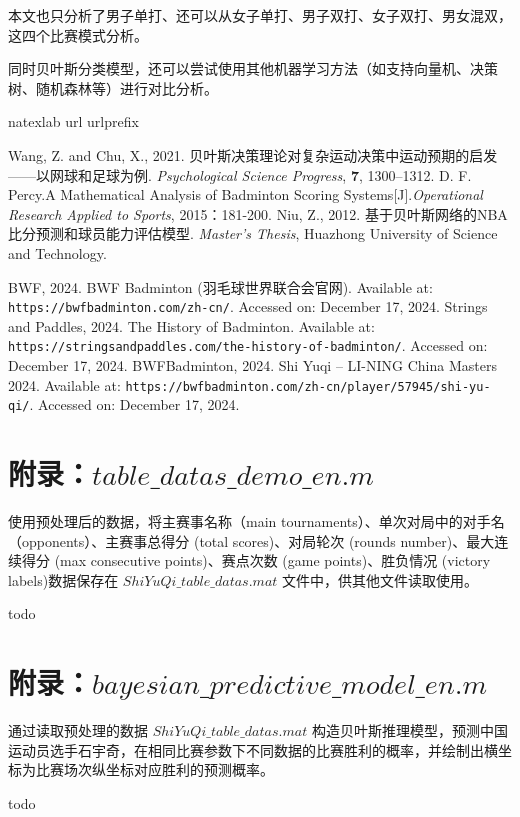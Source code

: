 \documentclass[12pt]{article}
\begin{document}
本文也只分析了男子单打、还可以从女子单打、男子双打、女子双打、男女混双，这四个比赛模式分析。

同时贝叶斯分类模型，还可以尝试使用其他机器学习方法（如支持向量机、决策树、随机森林等）进行对比分析。


\begin{thebibliography}{100}
	\expandafter\ifx\csname natexlab\endcsname\relax\def\natexlab#1{#1}\fi
	\expandafter\ifx\csname url\endcsname\relax
	\def\url#1{\texttt{#1}}\fi
	\expandafter\ifx\csname urlprefix\endcsname\relax\def\urlprefix{URL }\fi

Wang, Z. and Chu, X., 2021. 贝叶斯决策理论对复杂运动决策中运动预期的启发——以网球和足球为例. \textit{Psychological Science Progress}, \textbf{7}, 1300–1312.
D. F. Percy.A Mathematical Analysis of Badminton Scoring Systems[J].\textit{Operational Research Applied to Sports}, 2015：181-200.
Niu, Z., 2012. 基于贝叶斯网络的NBA比分预测和球员能力评估模型. \textit{Master's Thesis}, Huazhong University of Science and Technology.


BWF, 2024. BWF Badminton (羽毛球世界联合会官网). Available at: \url{https://bwfbadminton.com/zh-cn/}. Accessed on: December 17, 2024.
Strings and Paddles, 2024. The History of Badminton. Available at: \url{https://stringsandpaddles.com/the-history-of-badminton/}. Accessed on: December 17, 2024.
BWFBadminton, 2024. Shi Yuqi – LI-NING China Masters 2024. Available at: \url{https://bwfbadminton.com/zh-cn/player/57945/shi-yu-qi/}. Accessed on: December 17, 2024.

\end{thebibliography}

\appendix
\section{附录：$table\_datas\_demo\_en.m$}
使用预处理后的数据，将主赛事名称（main tournaments）、单次对局中的对手名（opponents）、主赛事总得分 (total scores)、对局轮次 (rounds number)、最大连续得分 (max consecutive points)、赛点次数 (game points)、胜负情况 (victory labels)数据保存在 $ShiYuQi\_table\_datas.mat$ 文件中，供其他文件读取使用。

todo 


\section{附录：$bayesian\_predictive\_model\_en.m$}
通过读取预处理的数据 $ShiYuQi\_table\_datas.mat$ 构造贝叶斯推理模型，预测中国运动员选手石宇奇，在相同比赛参数下不同数据的比赛胜利的概率，并绘制出横坐标为比赛场次纵坐标对应胜利的预测概率。

todo 
\end{document}

